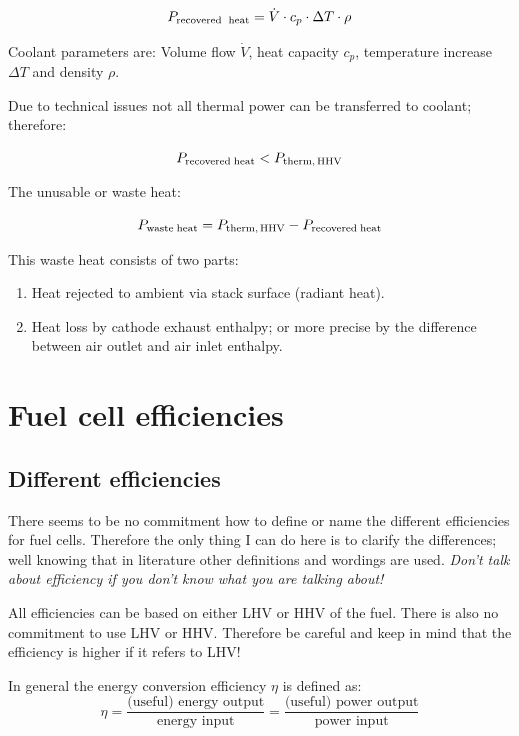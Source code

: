 \documentclass[11pt,a4paper,english,twoside]{scrreprt}
\begin{document}
\[
	P_{\text{recovered\; heat}} =\dot{V}\cdot c_{p} \cdot \Delta T\cdot \rho
\]

Coolant parameters are: Volume flow $\dot{V}$, heat capacity $c_{p}$, temperature increase $\Delta T$ and density $\rho$.


Due to technical issues not all thermal power can be transferred to coolant; therefore:

\[
	P_{\text{recovered\;heat}} < P_{\text{therm,\,HHV}} 
\]


The unusable or waste heat:

\[
	P_{\text{waste\;heat}} =P_{\text{therm,\,HHV}} -P_{\text{recovered\;heat}} 
\]


This waste heat consists of two parts:

\begin{enumerate}
\item  Heat rejected to ambient via stack surface (radiant heat).
\item  Heat loss by cathode exhaust enthalpy; or more precise by the difference between air outlet and air inlet enthalpy.
\end{enumerate}


\section{Fuel cell efficiencies}
\label{sec:Efficiency}

\subsection{Different efficiencies}

There seems to be no commitment how to define or name the different efficiencies for fuel cells. Therefore the only thing I can do here is to clarify the differences; well knowing that in literature other definitions and wordings are used. \textit{Don't talk about efficiency if you don't know what you are talking about!}

All efficiencies can be based on either LHV or HHV of the fuel. There is also no commitment to use LHV or HHV. Therefore be careful and keep in mind that the efficiency is higher if it refers to LHV!

In general the energy conversion efficiency $\eta$ is defined as:
\[
	\eta=\frac{\text{(useful)~energy~output}}{\text{energy~input}} = \frac{\text{(useful)~power~output}}{\text{power~input}}
\]
\end{document}
